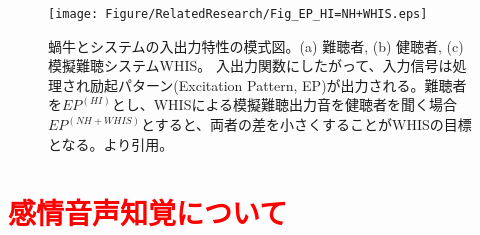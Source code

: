 \begin{figure}[t]
   \centerline{\texttt{[image: Figure/RelatedResearch/Fig\_EP\_HI=NH+WHIS.eps]}}
   \vspace{0pt}
   \caption{蝸牛とシステムの入出力特性の模式図。(a) 難聴者, (b) 健聴者, (c) 模擬難聴システムWHIS。
   入出力関数にしたがって、入力信号は処理され励起パターン(Excitation Pattern, EP)が出力される。難聴者を$EP^{(HI)}$とし、WHISによる模擬難聴出力音を健聴者を聞く場合$EP^{(NH+WHIS)}$とすると、両者の差を小さくすることがWHISの目標となる。\cite{irino2023hearing}より引用。
 }
 \vspace{-15pt}
 \label{fig:EP_HI=NH+WHIS}
 \end{figure}




\clearpage
\section{\textcolor{red}{感情音声知覚について}}

